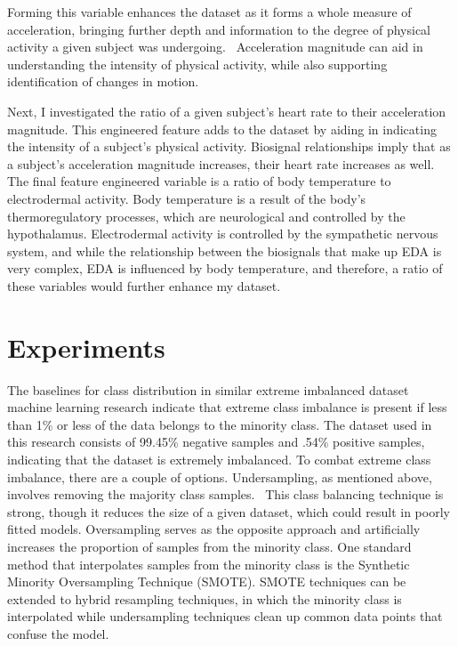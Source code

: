 \documentclass{article}
\begin{document}
Forming this variable enhances the dataset as it forms a whole measure of acceleration, bringing further depth and information to the degree of physical activity a given subject was undergoing.~\cite{Arif2014} Acceleration magnitude can aid in understanding the intensity of physical activity, while also supporting identification of changes in motion. 

Next, I investigated the ratio of a given subject’s heart rate to their acceleration magnitude. This engineered feature adds to the dataset by aiding in indicating the intensity of a subject’s physical activity. Biosignal relationships imply that as a subject’s acceleration magnitude increases, their heart rate increases as well. The final feature engineered variable is a ratio of body temperature to electrodermal activity. Body temperature is a result of the body’s thermoregulatory processes, which are neurological and controlled by the hypothalamus. Electrodermal activity is controlled by the sympathetic nervous system, and while the relationship between the biosignals that make up EDA is very complex, EDA is influenced by body temperature, and therefore, a ratio of these variables would further enhance my dataset. 

\section{Experiments}

The baselines for class distribution in similar extreme imbalanced dataset machine learning research indicate that extreme class imbalance is present if less than 1\% or less of the data belongs to the minority class. The dataset used in this research consists of 99.45\% negative samples and .54\% positive samples, indicating that the dataset is extremely imbalanced. To combat extreme class imbalance, there are a couple of options. Undersampling, as mentioned above, involves removing the majority class samples.~\cite{leborgne2022fraud} This class balancing technique is strong, though it reduces the size of a given dataset, which could result in poorly fitted models. Oversampling serves as the opposite approach and artificially increases the proportion of samples from the minority class. One standard method that interpolates samples from the minority class is the Synthetic Minority Oversampling Technique (SMOTE). SMOTE techniques can be extended to hybrid resampling techniques, in which the minority class is interpolated while undersampling techniques clean up common data points that confuse the model. 
\end{document}
